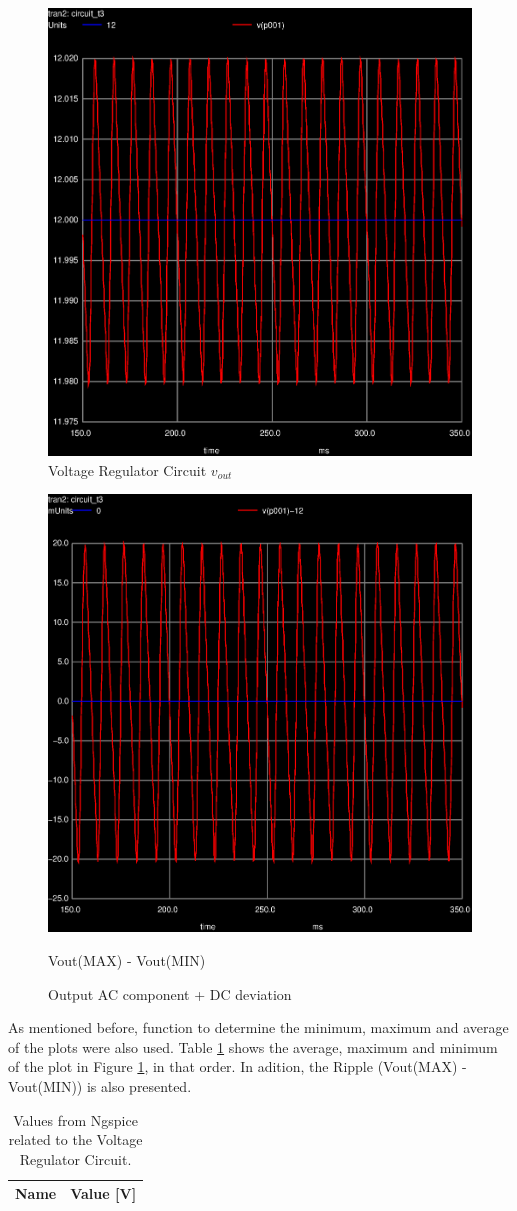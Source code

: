 \begin{figure}[ht]
	\centering
	\includegraphics[width=0.6\linewidth]{trans-vout_vr.eps}
	\caption{Voltage Regulator Circuit $v_{out}$}
\label{fig:VR_vout}
\end{figure}

\begin{figure}[ht]
	\centering
	\includegraphics[width=0.6\linewidth]{trans-vout_(ac+dc).eps}
	\caption{Output AC component + DC deviation}Vout(MAX) - Vout(MIN)
\label{fig:AC+DC}
\end{figure}


As mentioned before, function to determine the minimum, maximum and average of the
plots were also used. Table \ref{tab:trans} shows the average, maximum and minimum
of the plot in Figure \ref{fig:VR_vout}, in that order. In adition, the Ripple
(Vout(MAX) - Vout(MIN)) is also presented.


\begin{table}[ht]
	\centering
	\begin{tabular}{|l|r|}
		\hline    
		{\bf Name} & {\bf Value [V]} \\ \hline
		
	\end{tabular}
	
	\caption{Values from Ngspice related to the Voltage Regulator Circuit.}
    
\label{tab:trans}
\end{table}

